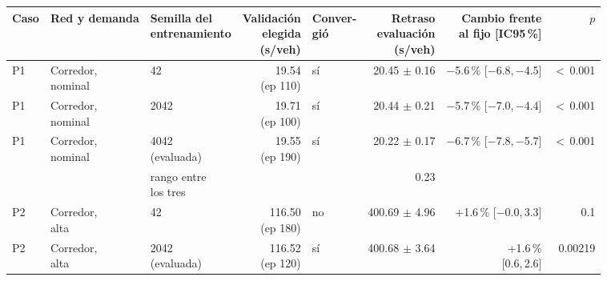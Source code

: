 \begin{table}[H]
\centering
\scriptsize
\setlength{\tabcolsep}{3pt}
\begin{tabular}{lllrlrrr}
\toprule
Caso & Red y demanda & \makecell{Semilla del\\entrenamiento} & \makecell{Validación\\elegida\\(s/veh)} & \makecell{Conver-\\gió} & \makecell{Retraso\\evaluación\\(s/veh)} & \makecell{Cambio frente\\al fijo [IC95\,\%]} & $p$ \\
\midrule
P1 & \makecell[l]{Corredor,\\{}nominal} & 42 & \makecell[r]{19.54\\{}(ep 110)} & sí & \makecell[r]{20.45\\{}$\pm$ 0.16} & \makecell[r]{$-$5.6\,\%\\{}[$-$6.8,\,$-$4.5]} & $<$\,0.001 \\
P1 & \makecell[l]{Corredor,\\{}nominal} & 2042 & \makecell[r]{19.71\\{}(ep 100)} & sí & \makecell[r]{20.44\\{}$\pm$ 0.21} & \makecell[r]{$-$5.7\,\%\\{}[$-$7.0,\,$-$4.4]} & $<$\,0.001 \\
P1 & \makecell[l]{Corredor,\\{}nominal} & \makecell[l]{4042\\{}(evaluada)} & \makecell[r]{19.55\\{}(ep 190)} & sí & \makecell[r]{20.22\\{}$\pm$ 0.17} & \makecell[r]{$-$6.7\,\%\\{}[$-$7.8,\,$-$5.7]} & $<$\,0.001 \\
 & & \makecell[l]{rango entre\\{}los tres} & & & 0.23 & & \\
P2 & \makecell[l]{Corredor,\\{}alta} & 42 & \makecell[r]{116.50\\{}(ep 180)} & no & \makecell[r]{400.69\\{}$\pm$ 4.96} & \makecell[r]{+1.6\,\%\\{}[$-$0.0,\,3.3]} & 0.1 \\
P2 & \makecell[l]{Corredor,\\{}alta} & \makecell[l]{2042\\{}(evaluada)} & \makecell[r]{116.52\\{}(ep 120)} & sí & \makecell[r]{400.68\\{}$\pm$ 3.64} & \makecell[r]{+1.6\,\%\\{}[0.6,\,2.6]} & 0.00219 \\

\end{tabular}
\end{table}
